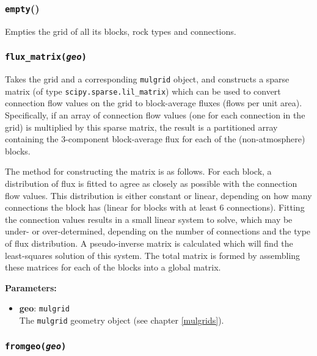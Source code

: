 \begin{snugshade}
\subsubsection{\texttt{empty}()}
\end{snugshade}
\label{sec:t2grid:empty}

Empties the grid of all its blocks, rock types and connections.

\begin{snugshade}
\subsubsection{\texttt{flux\_matrix(\emph{geo})}}
\end{snugshade}
\label{sec:t2grid:flux_matrix}

Takes the grid and a corresponding \texttt{mulgrid} object, and constructs a sparse matrix (of type \texttt{scipy.sparse.lil\_matrix}) which can be used to convert connection flow values on the grid to block-average fluxes (flows per unit area).  Specifically, if an array of connection flow values (one for each connection in the grid) is multiplied by this sparse matrix, the result is a partitioned array containing the 3-component block-average flux for each of the (non-atmosphere) blocks.

The method for constructing the matrix is as follows.  For each block, a distribution of flux is fitted to agree as closely as possible with the connection flow values.  This distribution is either constant or linear, depending on how many connections the block has (linear for blocks with at least 6 connections).  Fitting the connection values results in a small linear system to solve, which may be under- or over-determined, depending on the number of connections and the type of flux distribution.  A pseudo-inverse matrix is calculated which will find the least-squares solution of this system.  The total matrix is formed by assembling these matrices for each of the blocks into a global matrix.

\textbf{Parameters:}
\begin{itemize}
\item \textbf{geo}: \texttt{mulgrid}\\
  The \texttt{mulgrid} geometry object (see chapter \ref{mulgrids}).
\end{itemize}

\begin{snugshade}
\subsubsection{\texttt{fromgeo(\emph{geo})}}
\end{snugshade}
\label{sec:t2grid:fromgeo}

